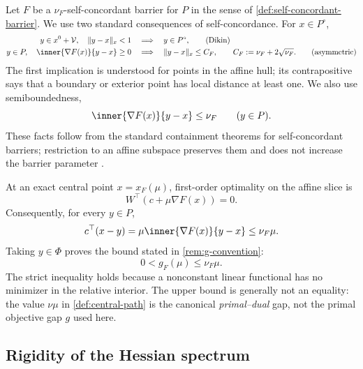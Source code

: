 Let $F$ be a $\nu_F$-self-concordant barrier for $P$ in the sense of
\cref{def:self-concordant-barrier}.  We use two standard consequences of
self-concordance.  For $x\in P^\circ$,
\begin{align}
 y\in x^0+\mathcal V,\quad
 \norm{y-x}_x<1&\quad\Longrightarrow\quad y\in P^\circ,
 \tag{Dikin}\label{eq:dikin-containment}\\
 y\in P,\quad
 \inner{\nabla F(x)}{y-x}\geq0
 &\quad\Longrightarrow\quad
 \norm{y-x}_x\leq C_F,
 \qquad C_F:=\nu_F+2\sqrt{\nu_F}.
 \tag{asymmetric}\label{eq:asymmetric-containment}
\end{align}
The first implication is understood for points in the affine hull; its
contrapositive says that a boundary or exterior point has local distance at
least one.  We also use semiboundedness,
\begin{equation}
 \inner{\nabla F(x)}{y-x}\leq\nu_F\qquad(y\in P).
 \label{eq:barrier-semiboundedness}
\end{equation}
These facts follow from the standard containment theorems for
self-concordant barriers; restriction to an affine subspace preserves them and
does not increase the barrier parameter
\cite{nesterov1994-interior-point-polynomial-algorithms-convex,renegar2001-mathematical-view-ipm}.

At an exact central point $x=x_F(\mu)$, first-order optimality on the affine
slice is
\begin{equation}
 W^\top(c+\mu\nabla F(x))=0.
 \label{eq:centrality-tangent}
\end{equation}
Consequently, for every $y\in P$,
\begin{equation}
 c^\top(x-y)=\mu\inner{\nabla F(x)}{y-x}\leq\nu_F\mu.
 \label{eq:central-objective-bound-pointwise}
\end{equation}
Taking $y\in\Phi$ proves the bound stated in \cref{rem:g-convention}:
\begin{equation}
 0<g_F(\mu)\leq\nu_F\mu.
 \label{eq:central-gap-bound}
\end{equation}
The strict inequality holds because a nonconstant linear functional has no
minimizer in the relative interior.  The upper bound is generally not an
equality: the value $\nu\mu$ in \cref{def:central-path} is the canonical
\emph{primal--dual} gap, not the primal objective gap $g$ used here.

\subsection{Rigidity of the Hessian spectrum}
\label{sec:conditioning-rigidity}

